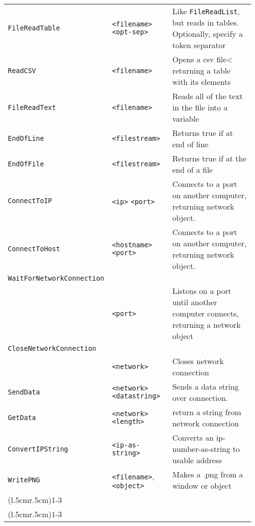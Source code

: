 \begin{longtable}{p{3cm}p{3cm}p{6cm}}
\verb+FileReadTable+ &\verb+<filename>+ \verb+<opt-sep>+ &Like \verb+FileReadList+, but reads in tables. Optionally, specify a token separator\\ 
\verb+ReadCSV+ &\verb+<filename>+&Opens a csv file< returning a table with its elements\\ 
\verb+FileReadText+ &\verb+<filename>+ &Reads all of the text in the file into a variable\\ 
\verb+EndOfLine+ &\verb+<filestream>+&Returns true if at end of line \\ 
\verb+EndOfFile+ &\verb+<filestream>+&Returns true if at the end of a file\\ 
\verb+ConnectToIP+ &\verb+<ip>+ \verb+<port>+&Connects to a port on another computer, returning network object.   \\
\verb+ConnectToHost+&\verb+<hostname>+ \verb+<port>+&Connects to a port on another computer, returning network object.\\
\verb+WaitForNetworkConnection+& & \\ 
& \verb+<port>+&Listens on a port until another computer connects, returning a network object\\
\verb+CloseNetworkConnection+& &\\
& \verb+<network>+& Closes network connection\\
\verb+SendData+&\verb+<network>+ \verb+<datastring>+&  Sends a data string over connection.\\
\verb+GetData+&\verb+<network>+ \verb+<length>+&return a string from network connection\\
\verb+ConvertIPString+&\verb+<ip-as-string>+&Converts an
ip-number-as-string to usable address \\
\verb+WritePNG+&\verb+<filename>+, \verb+<object>+ &Makes a .png from a window or object\\

\addlinespace[0.2cm] 

\cmidrule(l{.5cm}r{.5cm}){1-3} 
\multicolumn{3}{c}{\textbf{Graphical Objects Functions}}\\ 
\cmidrule(l{.5cm}r{.5cm}){1-3} 


\end{longtable}

